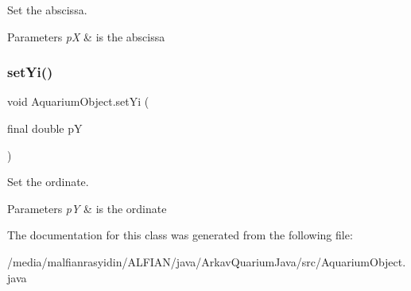 Set the abscissa.


\begin{DoxyParams}{Parameters}
{\em pX} & is the abscissa \\
\hline
\end{DoxyParams}
\mbox{\label{class_aquarium_object_a9bd7deefac91c170bcdc15c823184193}} 
\subsubsection{\texorpdfstring{set\+Yi()}{setYi()}}
{\footnotesize\ttfamily void Aquarium\+Object.\+set\+Yi (\begin{DoxyParamCaption}\item[{final double}]{pY }\end{DoxyParamCaption})\hspace{0.3cm}{\ttfamily [inline]}}

Set the ordinate.


\begin{DoxyParams}{Parameters}
{\em pY} & is the ordinate \\
\hline
\end{DoxyParams}


The documentation for this class was generated from the following file\+:\begin{DoxyCompactItemize}
\item 
/media/malfianrasyidin/\+A\+L\+F\+I\+A\+N/java/\+Arkav\+Quarium\+Java/src/Aquarium\+Object.\+java\end{DoxyCompactItemize}
